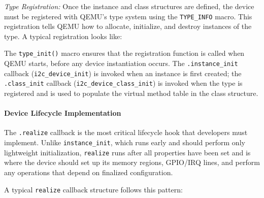 \textit{Type Registration:} Once the instance and class structures are defined, the device must be registered with QEMU's type system using the \texttt{TYPE\_INFO} macro. This registration tells QEMU how to allocate, initialize, and destroy instances of the type. A typical registration looks like:


%

The \texttt{type\_init()} macro ensures that the registration function is called when QEMU starts, before any device instantiation occurs. The \texttt{.instance\_init} callback (\texttt{i2c\_device\_init}) is invoked when an instance is first created; the \texttt{.class\_init} callback (\texttt{i2c\_device\_class\_init}) is invoked when the type is registered and is used to populate the virtual method table in the class structure.

\paragraph{Device Lifecycle Implementation}

The \texttt{.realize} callback is the most critical lifecycle hook that developers must implement. Unlike \texttt{instance\_init}, which runs early and should perform only lightweight initialization, \texttt{realize} runs after all properties have been set and is where the device should set up its memory regions, GPIO/IRQ lines, and perform any operations that depend on finalized configuration.

A typical \texttt{realize} callback structure follows this pattern:
%
%    
%    
%    
%    
%    

